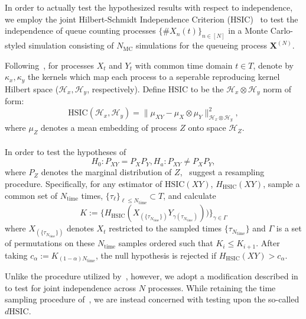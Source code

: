 In order to actually test the hypothesized results with respect to independence, we employ the joint Hilbert-Schmidt Independence Criterion (HSIC)~\cite{jointindep} to test the independence of queue counting processes $\{\#X_{n}(t)\}_{n \in [N]}$ in a Monte Carlo-styled
simulation consisting of $N_{\text{MC}}$ simulations for the queueing process $\mathbf{X}^{(N)}$.
\begin{definition}

    \label{hsichat}
    Following~\cite{nonstat}, for processes $X_{t}$ and $Y_{t}$ with common time domain $t \in T$, denote by $\kappa_{x}, \kappa_{y}$ the kernels which
    map each process to a seperable reproducing kernel Hilbert space ($\mathcal{H}_{x}, \mathcal{H}_{y}$, respectively).
    Define HSIC to be the $\mathcal{H}_{x} \otimes \mathcal{H}_{y}$ norm of form:
    \[\text{HSIC}(\mathcal{H}_{x},\mathcal{H}_{y}) = \|\mu_{XY} - \mu_{X} \otimes \mu_{Y}\|^{2}_{\mathcal{H}_{x} \otimes \mathcal{H}_{y}},\]
    where $\mu_{Z}$ denotes a mean embedding of process $Z$ onto space $\mathcal{H}_{Z}$.
    \\~\\
    In order to test the hypotheses of
    \[H_{0}: P_{XY} = P_{X}P_{Y}, H_{a}: P_{XY} \not = P_{X}P_{Y},\]
    where $P_{Z}$ denotes the marginal distribution of $Z$,~\cite{nonstat} suggest a resampling procedure.
    Specifically, for any estimator of $\text{HSIC}(XY)$, ${H_{\text{HSIC}}}(XY)$, sample a common set of $N_{\text{time}}$ times, $\{\tau_{\ell}\}_{\ell \leq N_{\text{time}}} \subset T$, and calculate \[K :=\{H_{\text{HSIC}}(X_{(\{\tau_{N_{\text{time}}}\})}Y_{\gamma(\tau_{N_{\text{time}}})}))\}_{\gamma \in \Gamma}\] where $X_{(\{\tau_{N_{\text{time}}}\})}$ denotes $X_{t}$ restricted to the sampled times $\{\tau_{N_{\text{time}}}\}$ and $\Gamma$ is a set of permutations on these $N_{\text{time}}$ samples ordered such that $K_{i} \leq K_{i+1}$.
    After taking $c_{\alpha} :=  K_{(1-\alpha)N_{\text{time}}}$, the null hypothesis is rejected if $H_{\text{HSIC}}(XY) > c_{\alpha}$.
\end{definition}

Unlike the procedure utilized by~\cite{nonstat}, however, we adopt a modification described in~\cite{jointindep} to test for joint independence across $N$ processes.
While retaining the time sampling procedure of~\cite{nonstat}, we are instead concerned with testing upon the so-called $d\text{HSIC}$.

